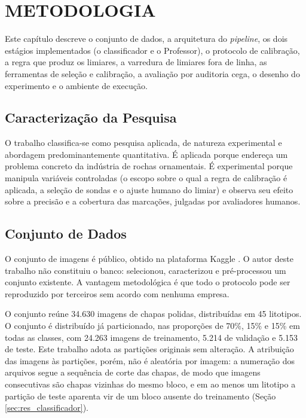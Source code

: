 \chapter[METODOLOGIA]{METODOLOGIA}

Este capítulo descreve o conjunto de dados, a arquitetura do \textit{pipeline}, os dois estágios implementados (o classificador e o Professor), o protocolo de calibração, a regra que produz os limiares, a varredura de limiares fora de linha, as ferramentas de seleção e calibração, a avaliação por auditoria cega, o desenho do experimento e o ambiente de execução.

\section{Caracterização da Pesquisa}

O trabalho classifica-se como pesquisa aplicada, de natureza experimental e abordagem predominantemente quantitativa. É aplicada porque endereça um problema concreto da indústria de rochas ornamentais. É experimental porque manipula variáveis controladas (o escopo sobre o qual a regra de calibração é aplicada, a seleção de sondas e o ajuste humano do limiar) e observa seu efeito sobre a precisão e a cobertura das marcações, julgadas por avaliadores humanos.

\section{Conjunto de Dados}
\label{sec:dados}

O conjunto de imagens é público, obtido na plataforma Kaggle \cite{dataset_araujo2023}. O autor deste trabalho não constituiu o banco: selecionou, caracterizou e pré-processou um conjunto existente. A vantagem metodológica é que todo o protocolo pode ser reproduzido por terceiros sem acordo com nenhuma empresa.

O conjunto reúne 34.630 imagens de chapas polidas, distribuídas em 45 litotipos. O conjunto é distribuído já particionado, nas proporções de 70\%, 15\% e 15\% em todas as classes, com 24.263 imagens de treinamento, 5.214 de validação e 5.153 de teste. Este trabalho adota as partições originais sem alteração. A atribuição das imagens às partições, porém, não é aleatória por imagem: a numeração dos arquivos segue a sequência de corte das chapas, de modo que imagens consecutivas são chapas vizinhas do mesmo bloco, e em ao menos um litotipo a partição de teste aparenta vir de um bloco ausente do treinamento (Seção \ref{sec:res_classificador}).

